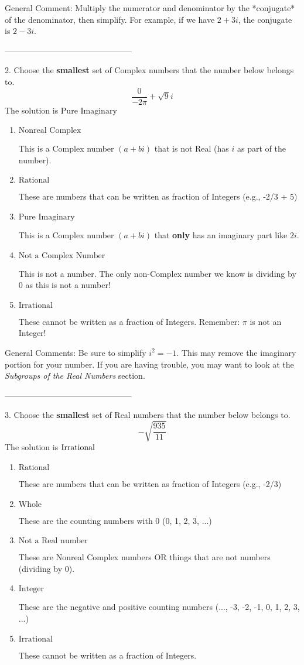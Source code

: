 \documentclass{article}[14pt]
\begin{document}
General Comment: Multiply the numerator and denominator by the *conjugate* of the denominator, then simplify. For example, if we have $2+3i$, the conjugate is $2-3i$.

-----------------------------------------------

2. Choose the \textbf{smallest} set of Complex numbers that the number below belongs to.
$$ \frac{0}{-2 \pi}+\sqrt{9}i $$ 
The solution is $ \text{Pure Imaginary} $ 

\begin{enumerate}[label=\Alph*.] 
\item $ \text{Nonreal Complex} $ 

 This is a Complex number $(a+bi)$ that is not Real (has $i$ as part of the number). 
\item $ \text{Rational} $ 

 These are numbers that can be written as fraction of Integers (e.g., -2/3 + 5) 
\item $ \text{Pure Imaginary} $ 

 This is a Complex number $(a+bi)$ that \textbf{only} has an imaginary part like $2i$. 
\item $ \text{Not a Complex Number} $ 

 This is not a number. The only non-Complex number we know is dividing by 0 as this is not a number! 
\item $ \text{Irrational} $ 

 These cannot be written as a fraction of Integers. Remember: $\pi$ is not an Integer! 
\end{enumerate} 
 
General Comments: Be sure to simplify $i^2 = -1$. This may remove the imaginary portion for your number. If you are having trouble, you may want to look at the \textit{Subgroups of the Real Numbers} section.

-----------------------------------------------

3. Choose the \textbf{smallest} set of Real numbers that the number below belongs to.
$$ -\sqrt{\frac{935}{11}} $$ 
The solution is $ \text{\text{Irrational}} $ 

\begin{enumerate}[label=\Alph*.] 
\item $ \text{Rational} $ 

 These are numbers that can be written as fraction of Integers (e.g., -2/3) 
\item $ \text{Whole} $ 

 These are the counting numbers with 0 (0, 1, 2, 3, ...) 
\item $ \text{Not a Real number} $ 

 These are Nonreal Complex numbers OR things that are not numbers (dividing by 0). 
\item $ \text{Integer} $ 

 These are the negative and positive counting numbers (..., -3, -2, -1, 0, 1, 2, 3, ...) 
\item $ \text{Irrational} $ 

 These cannot be written as a fraction of Integers. 
\end{enumerate} 
 
\end{document}
